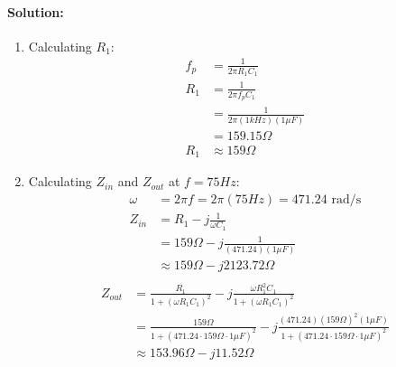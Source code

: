 \paragraph{Solution:}
\begin{enumerate}
  \item Calculating \(R_1\):
    \begin{align*}
      f_p &= \frac{1}{2 \pi R_1 C_1} \\
      R_1 &= \frac{1}{2 \pi f_p C_1} \\
          &= \frac{1}{2 \pi (1kHz)(1\mu F)} \\
          &= 159.15 \Omega \\
      R_1 &\approx 159 \Omega
    \end{align*}
  \item Calculating \(Z_{in}\) and \(Z_{out}\) at \(f = 75Hz\):
    \begin{align*}
      \omega &= 2 \pi f = 2 \pi (75Hz) = 471.24 \text{ rad/s} \\
      Z_{in} &= R_1 - j \frac{1}{\omega C_1} \\
             &= 159 \Omega - j \frac{1}{(471.24)(1\mu F)} \\
             &\approx 159 \Omega - j 2123.72 \Omega \\
    \end{align*}
    \begin{align*}
          Z_{out} &= \frac{R_1}{1 + (\omega R_1 C_1)^2} - j \frac{\omega R_1^2 C_1}{1 + (\omega R_1 C_1)^2} \\
              &= \frac{159 \Omega}{1 + (471.24 \cdot 159 \Omega \cdot 1\mu F)^2} - j \frac{(471.24)(159 \Omega)^2 (1\mu F)}{1 + (471.24 \cdot 159 \Omega \cdot 1\mu F)^2} \\
              &\approx 153.96 \Omega - j 11.52 \Omega
    \end{align*}
\end{enumerate}
